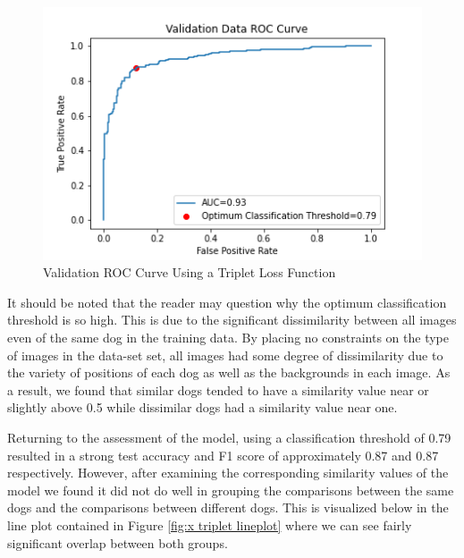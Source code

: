 \documentclass{article}
\begin{document}
\begin{figure}[h]
\centering
	\includegraphics[scale=0.7]{final-report-images/roc_curve_validation_triplet.png}
\caption{Validation ROC Curve Using a Triplet Loss Function}
\label{fig:x val roc curve}
\end{figure}

\noindent It should be noted that the reader may question why the optimum classification threshold is so high.  This is due to the significant dissimilarity between all images even of the same dog in the training data.  By placing no constraints on the type of images in the data-set set, all images had some degree of dissimilarity due to the variety of positions of each dog as well as the backgrounds in each image.  As a result, we found that similar dogs tended to have a similarity value near or slightly above 0.5 while dissimilar dogs had a similarity value near one.  

Returning to the assessment of the model, using a classification threshold of 0.79 resulted in a strong test accuracy and F1 score of approximately 0.87 and 0.87 respectively.  However, after examining the corresponding similarity values of the model we found it did not do well in grouping the comparisons between the same dogs and the comparisons between different dogs.  This is visualized below in the line plot contained in Figure \ref{fig:x triplet lineplot} where we can see fairly significant overlap between both groups.
\end{document}
